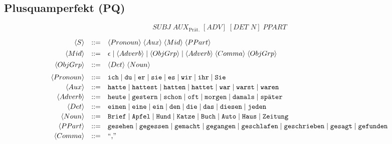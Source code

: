 \documentclass[areasetadvanced]{scrartcl}
\newcommand{\term}[1]{\text{\texttt{#1}}}
\begin{document}
\subsection{Plusquamperfekt (\textbf{PQ})}
\[
  \textit{SUBJ}\;\textit{AUX}_{\text{Prät.}}\;
  [\textit{ADV}]\;[\textit{DET N}]\;\textit{PPART}
\]

\[
\begin{array}{rcl}
\langle S\rangle &::=&
  \langle Pronoun\rangle\;
  \langle Aux\rangle\;
  \langle Mid\rangle\;
  \langle PPart\rangle \\[4pt]

\langle Mid\rangle &::=&
      \epsilon
  \mid \langle Adverb\rangle
  \mid \langle ObjGrp\rangle
  \mid \langle Adverb\rangle\;\langle Comma\rangle\;\langle ObjGrp\rangle \\[4pt]

\langle ObjGrp\rangle &::=&
  \langle Det\rangle\;\langle Noun\rangle \\[6pt]

\langle Pronoun\rangle &::=&
  \term{ich}\mid\term{du}\mid\term{er}\mid\term{sie}\mid
  \term{es}\mid\term{wir}\mid\term{ihr}\mid\term{Sie} \\[2pt]

\langle Aux\rangle &::=&
  \term{hatte}\mid\term{hattest}\mid\term{hatten}\mid
  \term{hattet}\mid\term{war}\mid\term{warst}\mid\term{waren} \\[2pt]

\langle Adverb\rangle &::=&
  \term{heute}\mid\term{gestern}\mid\term{schon}\mid
  \term{oft}\mid\term{morgen}\mid\term{damals}\mid\term{später} \\[2pt]

\langle Det\rangle &::=&
  \term{einen}\mid\term{eine}\mid\term{ein}\mid
  \term{den}\mid\term{die}\mid\term{das}\mid\term{diesen}\mid\term{jeden} \\[2pt]

\langle Noun\rangle &::=&
  \term{Brief}\mid\term{Apfel}\mid\term{Hund}\mid\term{Katze}\mid
  \term{Buch}\mid\term{Auto}\mid\term{Haus}\mid\term{Zeitung} \\[2pt]

\langle PPart\rangle &::=&
  \term{gesehen}\mid\term{gegessen}\mid\term{gemacht}\mid
  \term{gegangen}\mid\term{geschlafen}\mid
  \term{geschrieben}\mid\term{gesagt}\mid\term{gefunden} \\[2pt]

\langle Comma\rangle &::=& \text{``,''}
\end{array}
\]
\end{document}
